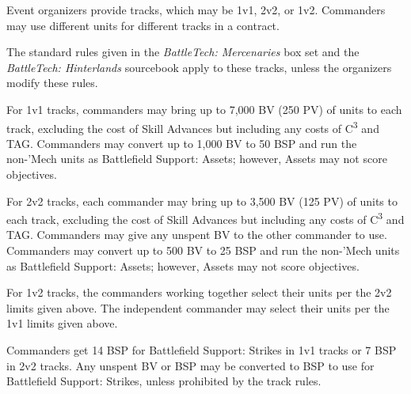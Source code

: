 Event organizers provide tracks, which may be 1v1, 2v2, or 1v2.
Commanders may use different units for different tracks in a contract.

The standard rules given in the \emph{BattleTech: Mercenaries} box set and the \emph{BattleTech: Hinterlands} sourcebook apply to these tracks, unless the organizers modify these rules.

For 1v1 tracks, commanders may bring up to 7,000 BV (250 PV) of units to each track, excluding the cost of Skill Advances but including any costs of C\textsuperscript{3} and TAG.
Commanders may convert up to 1,000 BV to 50 BSP and run the non-'Mech units as Battlefield Support: Assets; however, Assets may not score objectives.

For 2v2 tracks, each commander may bring up to 3,500 BV (125 PV) of units to each track, excluding the cost of Skill Advances but including any costs of C\textsuperscript{3} and TAG.
Commanders may give any unspent BV to the other commander to use.
Commanders may convert up to 500 BV to 25 BSP and run the non-'Mech units as Battlefield Support: Assets; however, Assets may not score objectives.

For 1v2 tracks, the commanders working together select their units per the 2v2 limits given above.
The independent commander may select their units per the 1v1 limits given above.

Commanders get 14 BSP for Battlefield Support: Strikes in 1v1 tracks or 7 BSP in 2v2 tracks.
Any unspent BV or BSP may be converted to BSP to use for Battlefield Support: Strikes, unless prohibited by the track rules.

